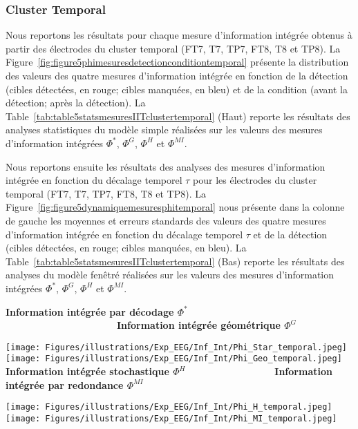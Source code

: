 \subsubsection{Cluster Temporal}
\label{resultatstiiclustertemporal}

Nous reportons les résultats pour chaque mesure d'information intégrée obtenus à partir des électrodes du cluster temporal (FT7, T7, TP7, FT8, T8 et TP8). 
La Figure~\ref{fig:figure5phimesuresdetectionconditiontemporal} présente la distribution des valeurs des quatre mesures d'information intégrée en fonction de la détection (cibles détectées, en rouge; cibles manquées, en bleu) et de la condition (avant la détection; après la détection). 
La Table~\ref{tab:table5statsmesuresIITclustertemporal} (Haut) reporte les résultats des analyses statistiques du modèle simple réalisées sur les valeurs des mesures d'information intégrées $\Phi^{*}$, $\Phi^{G}$, $\Phi^{H}$ et $\Phi^{MI}$. 

Nous reportons ensuite les résultats des analyses des mesures d'information intégrée en fonction du décalage temporel $\tau$ pour les électrodes du cluster temporal (FT7, T7, TP7, FT8, T8 et TP8). 
La Figure~\ref{fig:figure5dynamiquemesuresphitemporal} nous présente dans la colonne de gauche les moyennes et erreurs standards des valeurs des quatre mesures d'information intégrée en fonction du décalage temporel $\tau$ et de la détection (cibles détectées, en rouge; cibles manquées, en bleu). 
La Table~\ref{tab:table5statsmesuresIITclustertemporal} (Bas) reporte les résultats des analyses du modèle fenêtré réalisées sur les valeurs des mesures d'information intégrées $\Phi^{*}$, $\Phi^{G}$, $\Phi^{H}$ et $\Phi^{MI}$. 

\begin{figure*}[!t]
\centering
\textbf{Information intégrée par décodage $\Phi^{*}$~~~~~~~~~~~~~~~~~~~~Information intégrée géométrique $\Phi^{G}$}\par\medskip
\texttt{[image: Figures/illustrations/Exp\_EEG/Inf\_Int/Phi\_Star\_temporal.jpeg]}
\texttt{[image: Figures/illustrations/Exp\_EEG/Inf\_Int/Phi\_Geo\_temporal.jpeg]}
\textbf{Information intégrée stochastique $\Phi^{H}$~~~~~~~~~~~~~~~~Information intégrée par redondance $\Phi^{MI}$}\par\medskip
\texttt{[image: Figures/illustrations/Exp\_EEG/Inf\_Int/Phi\_H\_temporal.jpeg]}
\texttt{[image: Figures/illustrations/Exp\_EEG/Inf\_Int/Phi\_MI\_temporal.jpeg]}
\caption[Mesures d'information intégrée du cluster temporal pour la détection et la condition.]{Mesures d'information intégrée représentées ici pour le cluster temporal sous forme de violin-plot en fonction de la détection (cibles détectées, en rouge; cibles manquées, en bleu) et de la condition (avant la détection; après la détection) :  $\Phi^{*}$ (Haut Gauche) ; $\Phi^{G}$ (Haut Droite) ; $\Phi^{H}$ (Bas Gauche) et $\Phi^{MI}$ (Bas Droite).}
\label{fig:figure5phimesuresdetectionconditiontemporal}
\end{figure*}

